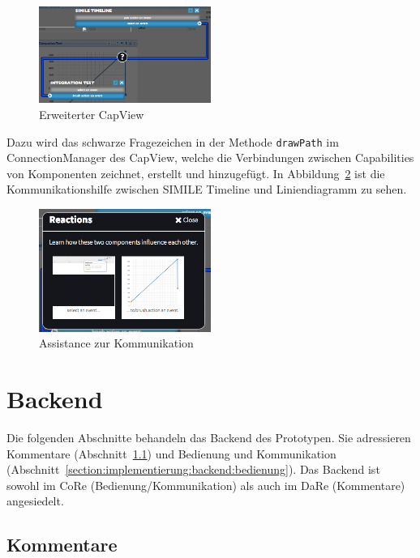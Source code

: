 \documentclass[
	headsepline,
	footsepline,
	fontsize=12pt,
	bibliography=totoc
]{scrbook}
\begin{document}
\begin{figure}[htbp]
   \centering
   \includegraphics[width=0.5\textwidth]{images/implementierung-ui-capview.png}
   \caption{Erweiterter CapView}
   \label{figure:ui-capview}
\end{figure}

Dazu wird das schwarze Fragezeichen in der Methode \texttt{drawPath} im ConnectionManager des CapView, welche die Verbindungen zwischen Capabilities von Komponenten zeichnet, erstellt und hinzugefügt. In Abbildung~\ref{figure:ui-communication} ist die Kommunikationshilfe zwischen SIMILE Timeline und Liniendiagramm zu sehen.

\begin{figure}[htbp]
   \centering
   \includegraphics[width=0.5\textwidth]{images/implementierung-ui-communication.png}
   \caption{Assistance zur Kommunikation}
   \label{figure:ui-communication}
\end{figure}

\section{Backend}
\label{section:implementierung:backend}

Die folgenden Abschnitte behandeln das Backend des Prototypen. Sie adressieren Kommentare (Abschnitt~\ref{section:implementierung:backend:kommentare}) und Bedienung und Kommunikation (Abschnitt~\ref{section:implementierung:backend:bedienung}). Das Backend ist sowohl im CoRe (Bedienung/Kommunikation) als auch im DaRe (Kommentare) angesiedelt.

\subsection{Kommentare}
\label{section:implementierung:backend:kommentare}
\end{document}
